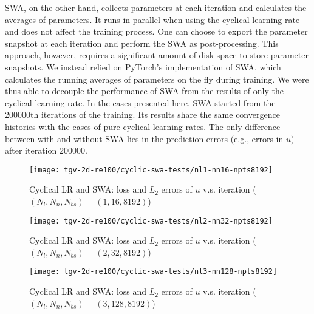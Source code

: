 SWA, on the other hand, collects parameters at each iteration and calculates the averages of parameters.
It runs in parallel when using the cyclical learning rate and does not affect the training process.
One can choose to export the parameter snapshot at each iteration and perform the SWA as post-processing.
This approach, however, requires a significant amount of disk space to store parameter snapshots.
We instead relied on PyTorch's implementation of SWA, which calculates the running averages of parameters on the fly during training.
We were thus able to decouple the performance of SWA from the results of only the cyclical learning rate.
In the cases presented here, SWA started from the \num{200000}th iterations of the training.
Its results share the same convergence histories with the cases of pure cyclical learning rates.
The only difference between with and without SWA lies in the prediction errors (e.g., errors in $u$) after iteration \num{200000}.

\begin{figure}[hbt!]
    \centering%
    \texttt{[image: tgv-2d-re100/cyclic-swa-tests/nl1-nn16-npts8192]}%
    \caption[%
        Cyclical LR and SWA: loss and $L_2$ errors of $u$ v.s. iteration ($(N_l, N_n, N_{bs})=(1, 16, 8192)$)%
    ]{%
        Cyclical LR and SWA: loss and $L_2$ errors of $u$ v.s. iteration ($(N_l, N_n, N_{bs})=(1, 16, 8192)$)%
    }\label{fig:cyclic-swa-tests-nl1-nn16-npts8192}%
\end{figure}

\begin{figure}[hbt!]
    \centering%
    \texttt{[image: tgv-2d-re100/cyclic-swa-tests/nl2-nn32-npts8192]}%
    \caption[%
        Cyclical LR and SWA: loss and $L_2$ errors of $u$ v.s. iteration ($(N_l, N_n, N_{bs})=(2, 32, 8192)$)%
    ]{%
        Cyclical LR and SWA: loss and $L_2$ errors of $u$ v.s. iteration ($(N_l, N_n, N_{bs})=(2, 32, 8192)$)%
    }\label{fig:cyclic-swa-tests-nl2-nn32-npts8192}%
\end{figure}

\begin{figure}[hbt!]
    \centering%
    \texttt{[image: tgv-2d-re100/cyclic-swa-tests/nl3-nn128-npts8192]}%
    \caption[%
        Cyclical LR and SWA: loss and $L_2$ errors of $u$ v.s. iteration ($(N_l, N_n, N_{bs})=(3, 128, 8192)$)%
    ]{%
        Cyclical LR and SWA: loss and $L_2$ errors of $u$ v.s. iteration ($(N_l, N_n, N_{bs})=(3, 128, 8192)$)%
    }\label{fig:cyclic-swa-tests-nl3-nn128-npts8192}%
\end{figure}

